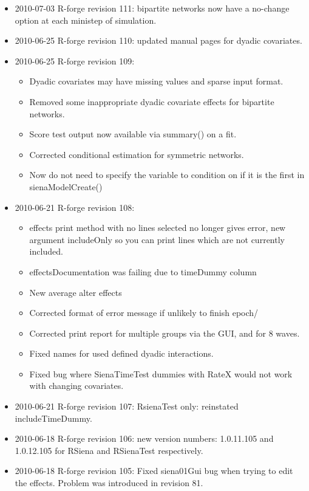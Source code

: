 \documentclass[a4paper,fleqn,11pt]{article}
\newcommand{\+}{\, + \,}
\newcommand{\sfn}[1]{\textsf{#1}}
\begin{document}
{\begin{small}
\begin{itemize}
  covariates and only 2 waves. (Introduced in revision 109).
\item 2010-07-03 R-forge revision 111: bipartite networks now have a no-change
  option at each ministep of simulation.
\item 2010-06-25 R-forge revision 110: updated manual pages for dyadic
  covariates.
\item 2010-06-25 R-forge revision 109:
\begin{itemize}
\item Dyadic covariates may have missing values and sparse input format.
\item Removed some inappropriate dyadic covariate effects for bipartite
  networks.
\item Score test output now available via summary() on a fit.
\item Corrected conditional estimation for symmetric networks.
\item Now do not need to specify the variable to condition on if it is the first
  in \sfn{sienaModelCreate()}
\end{itemize}
\item 2010-06-21 R-forge revision 108:
\begin{itemize}
\item effects print method with no lines selected no longer gives error, new
  argument includeOnly so you can print lines which are not currently included.
\item effectsDocumentation was failing due to timeDummy column
\item New average alter effects
\item Corrected format of error message if unlikely to finish epoch/
\item Corrected print report for multiple groups via the GUI, and for 8 waves.
\item Fixed names for used defined dyadic interactions.
\item Fixed bug where SienaTimeTest dummies with RateX would not work with
  changing covariates.
\end{itemize}
\item 2010-06-21 R-forge revision 107: RsienaTest only: reinstated
includeTimeDummy.
\item 2010-06-18 R-forge revision 106: new version numbers:
  1.0.11.105 and 1.0.12.105 for RSiena and RSienaTest respectively.
\item 2010-06-18 R-forge revision 105: Fixed siena01Gui bug when trying to edit
  the effects. Problem was introduced in revision 81.

\end{itemize}
\end{small}}
\end{document}
